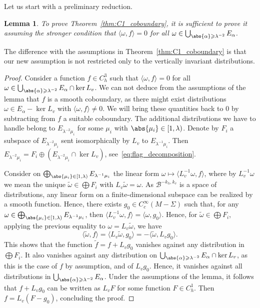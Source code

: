\documentclass[11pt, a4paper, oneside, final, pagebackref]{amsart}
\newcommand{\boB}{\mathcal{B}}
\renewcommand{\geq}{\geqslant}
\newtheorem{lem}[thm]{Lemma}
\theoremstyle{definition}
\numberwithin{equation}{section}
\begin{document}
Let us start with a preliminary reduction.
\begin{lem}
\label{lem:stronger_assumptions} To prove Theorem~\ref{thm:C1_coboundary}, it
is sufficient to prove it assuming the stronger condition that $\langle
\omega, f \rangle = 0$ for all $\omega \in \bigcup_{\abs{\alpha} \geq
\lambda^{-2}} E_\alpha$.
\end{lem}
The difference with the assumptions in Theorem~\ref{thm:C1_coboundary} is
that our new assumption is not restricted only to the vertically invariant
distributions.
\begin{proof}
Consider a function $f \in C^3_h$ such that $\langle \omega, f \rangle = 0$
for all $\omega \in \bigcup_{\abs{\alpha} \geq \lambda^{-2}} E_\alpha \cap
\ker L_v$. We can not deduce from the assumptions of the lemma that $f$ is a
smooth coboundary, as there might exist distributions $\omega \in E_\alpha -
\ker L_v$ with $\langle \omega, f \rangle \neq 0$. We will bring these
quantities back to $0$ by subtracting from $f$ a suitable coboundary. The
additional distributions we have to handle belong to $E_{\lambda^{-2}\mu_i}$
for some $\mu_i$ with $\abs{\mu_i} \in [1, \lambda)$. Denote by $F_i$ a
subspace of $E_{\lambda^{-2}\mu_i}$ sent isomorphically by $L_v$ to
$E_{\lambda^{-1}\mu_i}$. Then $E_{\lambda^{-2}\mu_i} = F_i \oplus
(E_{\lambda^{-2}\mu_i} \cap \ker L_v)$, see~\eqref{eq:flag_decomposition}.

Consider on $\bigoplus_{\abs{\mu_i} \in [1, \lambda)} E_{\lambda^{-1}\mu_i}$
the linear form $\omega \mapsto \langle L_v^{-1}\omega, f\rangle$, where by
$L_v^{-1}\omega$ we mean the unique $\tilde \omega \in \bigoplus F_i$ with
$L_v \tilde \omega = \omega$. As $\boB^{-k_h, k_v}$ is a space of
distributions, any linear form on a finite-dimensional subspace can be
realized by a smooth function. Hence, there exists $g_0 \in
C^\infty_c(M-\Sigma)$ such that, for any $\omega \in \bigoplus_{\abs{\mu_i}
\in [1, \lambda)} E_{\lambda^{-1}\mu_i}$, then $\langle L_v^{-1}\omega,
f\rangle = \langle \omega, g_0\rangle$. Hence, for $\tilde \omega \in
\bigoplus F_i$, applying the previous equality to $\omega = L_v\tilde\omega$,
we have
\begin{equation*}
  \langle \tilde \omega, f \rangle =
  \langle L_v \tilde \omega, g_0 \rangle = -\langle \tilde \omega, L_v g_0 \rangle.
\end{equation*}
This shows that the function $\tilde f = f + L_v g_0$ vanishes against any
distribution in $\bigoplus F_i$. It also vanishes against any distribution on
$\bigcup_{\abs{\alpha}\geq \lambda^{-2}} E_\alpha \cap \ker L_v$, as this is
the case of $f$ by assumption, and of $L_v g_0$. Hence, it vanishes against
all distributions in $\bigcup_{\abs{\alpha} \geq \lambda^{-2}} E_\alpha$.
Under the assumptions of the lemma, it follows that $f+L_v g_0$ can be
written as $L_v F$ for some function $F \in C^1_h$. Then $f= L_v(F-g_0)$,
concluding the proof.
\end{proof}
\end{document}
